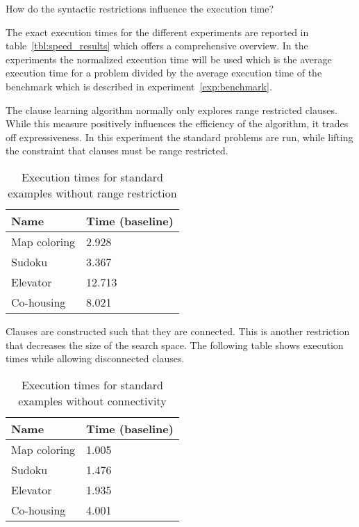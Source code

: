 \begin{question}
	How do the syntactic restrictions influence the execution time?
	\label{q:cd_speed_influence_res}
\end{question}

The exact execution times for the different experiments are reported in table~\ref{tbl:speed_results} which offers a comprehensive overview.
In the experiments the normalized execution time will be used which is the average execution time for a problem divided by the average execution time of the benchmark which is described in experiment~\ref{exp:benchmark}.

\begin{experiment}
	The clause learning algorithm normally only explores range restricted clauses.
	While this measure positively influences the efficiency of the algorithm, it trades off expressiveness.
	In this experiment the standard problems are run, while lifting the constraint that clauses must be range restricted.

	\begin{table}[!htp]
		\begin{tabularx}{\textwidth}{XX}
		\textbf{Name} 	& \textbf{Time (baseline)} \\
		\toprule
		Map coloring 	& 2.928					\\
		Sudoku 			& 3.367					\\
		Elevator 		& 12.713				\\
		Co-housing 		& 8.021					
		\end{tabularx}
		\caption{Execution times for standard examples without range restriction}
		\label{tbl:exp_speed_no_range}
	\end{table}

\end{experiment}

\begin{experiment}
	Clauses are constructed such that they are connected.
	This is another restriction that decreases the size of the search space.
	The following table shows execution times while allowing disconnected clauses.

	\begin{table}[!htp]
		\begin{tabularx}{\textwidth}{XX}
		\textbf{Name}	& \textbf{Time (baseline)}	\\
		\toprule
		Map coloring 	& 1.005					\\
		Sudoku 			& 1.476					\\
		Elevator 		& 1.935					\\
		Co-housing 		& 4.001					
		\end{tabularx}
		\caption{Execution times for standard examples without connectivity}
		\label{tbl:exp_speed_no_connect}
	\end{table}

\end{experiment}

